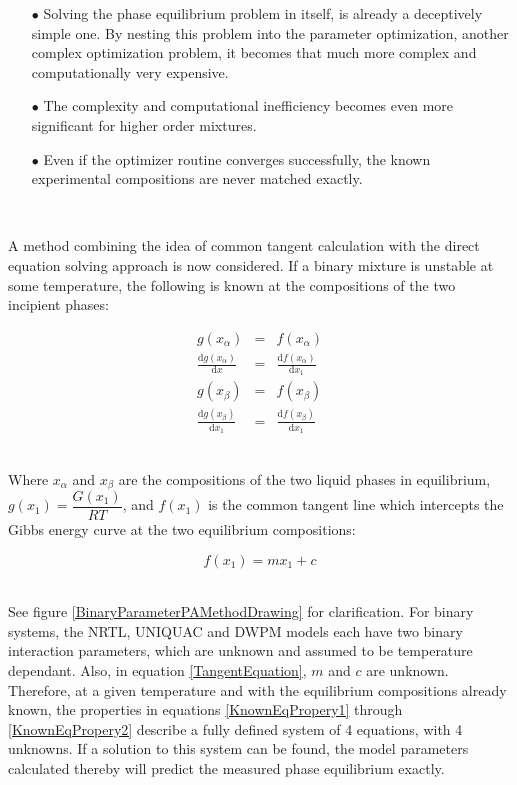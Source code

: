 \begin{itemize}
\item[$\bullet$] Solving the phase equilibrium problem in itself, is already a deceptively simple one. By nesting this problem into the parameter optimization, another complex optimization problem, it becomes that much more complex and computationally very expensive. \
\item[$\bullet$] The complexity and computational inefficiency becomes even more significant for higher order mixtures.\
\item[$\bullet$] Even if the optimizer routine converges successfully, the known experimental compositions are never matched exactly.\
\end{itemize}\

A method combining the idea of common tangent calculation with the direct equation solving approach is now considered. If a binary mixture is unstable at some temperature,  the following is known at the compositions of the two incipient phases:\

\begin{eqnarray}
g\left(x_{\alpha}\right) &=& f\left(x_{\alpha}\right) \label{KnownEqPropery1}\\
\frac{\mathrm{d}g\left(x_{\alpha}\right)}{\mathrm{d}x} &=& \frac{\mathrm{d}f\left(x_{\alpha}\right)}{\mathrm{d}x_{1}}\\
g\left(x_{\beta}\right) &=& f\left(x_{\beta}\right)\\
\frac{\mathrm{d}g\left(x_{\beta}\right)}{\mathrm{d}x_{1}} &=& \frac{\mathrm{d}f\left(x_{\beta}\right)}{\mathrm{d}x_{1}}\label{KnownEqPropery2} 
\end{eqnarray}\

Where $x_{\alpha}$ and $x_{\beta}$ are the compositions of the two liquid phases in equilibrium, $g\left(x_{1}\right) = \dfrac{G\left(x_{1}\right)}{RT}$, and $f\left(x_{1}\right)$ is the common tangent line which intercepts the Gibbs energy curve at the two equilibrium compositions:\

\begin{equation}
f\left(x_{1}\right) = mx_{1} + c \label{TangentEquation}
\end{equation}\

See figure \ref{BinaryParameterPAMethodDrawing} for clarification. For binary systems, the NRTL, UNIQUAC and DWPM models each have two binary interaction parameters, which are unknown and assumed to be temperature dependant. Also, in equation \ref{TangentEquation}, $m$ and $c$ are unknown. Therefore, at a given temperature and with the equilibrium compositions already known, the properties in equations \ref{KnownEqPropery1} through \ref{KnownEqPropery2} describe a fully defined system of 4 equations, with 4 unknowns. If a solution to this system can be found, the model parameters calculated thereby will predict the measured phase equilibrium exactly.\\

